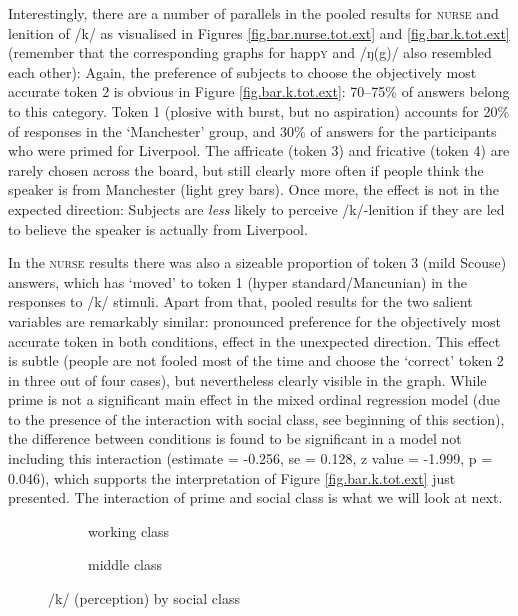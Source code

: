 Interestingly, there are a number of parallels in the pooled results for \textsc{nurse} and lenition of /k/ as visualised in Figures \ref{fig.bar.nurse.tot.ext} and \ref{fig.bar.k.tot.ext} (remember that the corresponding graphs for happ\textsc{y} and /ŋ(g)/ also resembled each other):
Again, the preference of subjects to choose the objectively most accurate token 2 is obvious in Figure \ref{fig.bar.k.tot.ext}: 70--75\% of answers belong to this category.
Token 1 (plosive with burst, but no aspiration) accounts for 20\% of responses in the `Manchester' group, and 30\% of answers for the participants who were primed for Liverpool.
The affricate (token 3) and fricative (token 4) are rarely chosen across the board, but still clearly more often if people think the speaker is from Manchester (light grey bars).
Once more, the  effect is not in the expected direction: Subjects are \emph{less} likely to perceive /k/-lenition if they are led to believe the speaker is actually from Liverpool.

In the \textsc{nurse} results there was also a sizeable proportion of token 3 (mild Scouse) answers, which has `moved' to token 1 (hyper standard/Mancunian) in the responses to /k/ stimuli.
Apart from that, pooled results for the two salient variables are remarkably similar: pronounced preference for the objectively most accurate token in both conditions,  effect in the unexpected direction.
This  effect is subtle (people are not fooled most of the time and choose the `correct' token 2 in three out of four cases), but nevertheless clearly visible in the graph.
While prime is not a significant main effect in the mixed ordinal regression model (due to the presence of the interaction with social class, see beginning of this section), the difference between conditions is found to be significant in a model not including this interaction (estimate = -0.256, se = 0.128, z value = -1.999, p = 0.046), which supports the interpretation of Figure \ref{fig.bar.k.tot.ext} just presented.
The interaction of prime and social class is what we will look at next.

\begin{figure}[h]
	\centering
	\begin{subfigure}{0.49\textwidth}
		\centering
			\resizebox{\linewidth}{!}{} 
		\caption{working class}
		\label{fig.bar.k.ext.wc}
	\end{subfigure}
	\begin{subfigure}{0.49\textwidth}
		\centering
			\resizebox{\linewidth}{!}{} 
		\caption{middle class}
		\label{fig.bar.k.ext.mc}
	\end{subfigure}
	\caption{/k/ (perception) by social class}
	\label{fig.bar.k.ext.class}
\end{figure}

